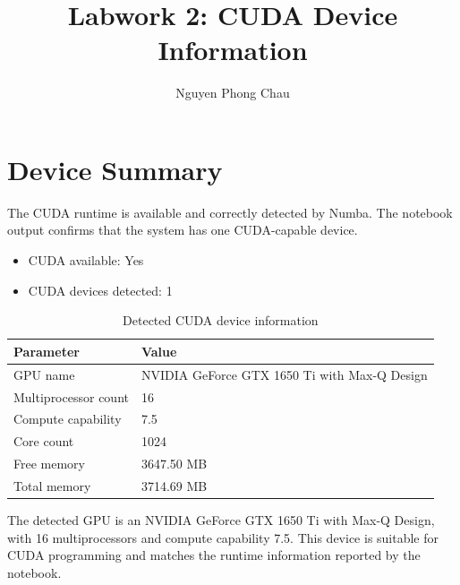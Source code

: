 \documentclass[a4paper,11pt]{report}
\title{Labwork 2: CUDA Device Information}
\author{Nguyen Phong Chau}
\date{}
\begin{document}
\maketitle

\section*{Device Summary}

The CUDA runtime is available and correctly detected by Numba. The notebook output confirms that the system has one CUDA-capable device.

\begin{itemize}
    \item CUDA available: Yes
    \item CUDA devices detected: 1
\end{itemize}

\begin{table}[h]
\centering
\renewcommand{\arraystretch}{1.15}
\begin{tabular}{p{}p{}}
\toprule
Parameter & Value \\
\midrule
GPU name & NVIDIA GeForce GTX 1650 Ti with Max-Q Design \\
Multiprocessor count & 16 \\
Compute capability & 7.5 \\
Core count & 1024 \\
Free memory & 3647.50 MB \\
Total memory & 3714.69 MB \\
\bottomrule
\end{tabular}
\caption{Detected CUDA device information}
\end{table}

The detected GPU is an NVIDIA GeForce GTX 1650 Ti with Max-Q Design, with 16 multiprocessors and compute capability 7.5. This device is suitable for CUDA programming and matches the runtime information reported by the notebook.
\end{document}
